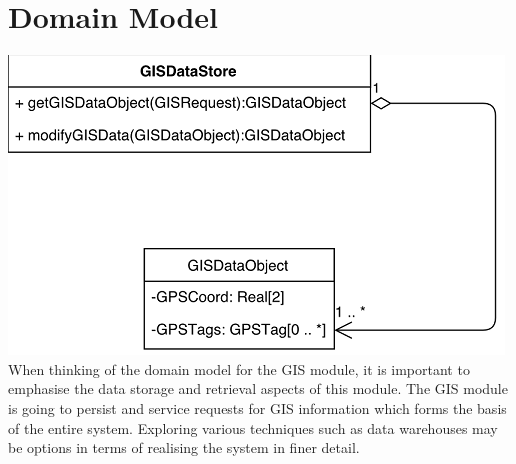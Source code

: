 \documentclass[a4paper,10pt]{article}
\begin{document}
	\section{Domain Model}
	\includegraphics[scale=0.75]{GIS_Domain_Model.png}
	\vspace{0.25cm}\newline\newline
	When thinking of the domain model for the GIS module, it is important to emphasise
	the data storage and retrieval aspects of this module. The GIS module is going to
	persist and service requests for GIS information which forms the basis of the entire
	system. Exploring various techniques such as data warehouses may be options in
	terms of realising the system in finer detail.	
	
\end{document}
